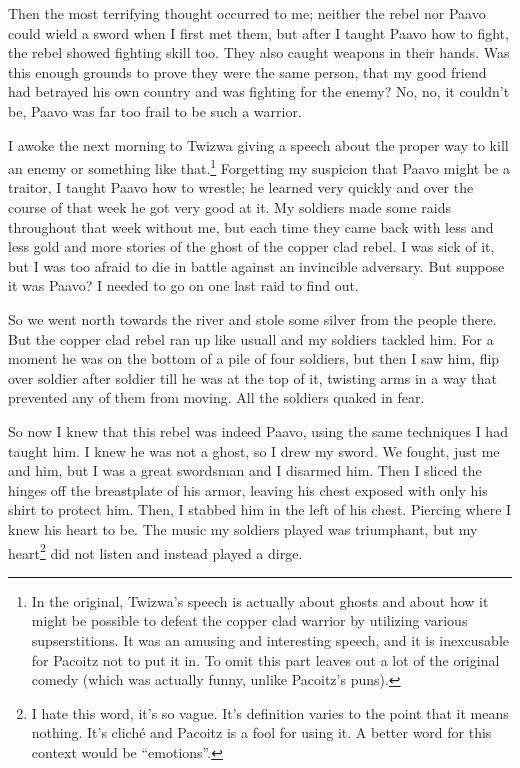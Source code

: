 Then the most terrifying thought occurred to me; neither the rebel nor Paavo could wield a sword when I first met them, but after I taught Paavo how to fight, the rebel showed fighting skill too. They also caught weapons in their hands. Was this enough grounds to prove they were the same person, that my good friend had betrayed his own country and was fighting for the enemy? No, no, it couldn't be, Paavo was far too frail to be such a warrior.

\tbreak

I awoke the next morning to Twizwa giving a speech about the proper way to kill an enemy or something like that.\footnote{In the original, Twizwa's speech is actually about ghosts and about how it might be possible to defeat the copper clad warrior by utilizing various supserstitions. It was an amusing and interesting speech, and it is inexcusable for Pacoitz not to put it in. To omit this part leaves out a lot of the original comedy (which was actually funny, unlike Pacoitz's puns).}
Forgetting my suspicion that Paavo might be a traitor, I taught Paavo how to wrestle; he learned very quickly and over the course of that week he got very good at it. My soldiers made some raids throughout that week without me, but each time they came back with less and less gold and more stories of the ghost of the copper clad rebel. I was sick of it, but I was too afraid to die in battle against an invincible adversary. But suppose it was Paavo? I needed to go on one last raid to find out.

So we went north towards the river and stole some silver from the people there. But the copper clad rebel ran up like usuall and my soldiers tackled him. For a moment he was on the bottom of a pile of four soldiers, but then I saw him, flip over soldier after soldier till he was at the top of it, twisting arms in a way that prevented any of them from moving. All the soldiers quaked in fear.

So now I knew that this rebel was indeed Paavo, using the same techniques I had taught him. I knew he was not a ghost, so I drew my sword. We fought, just me and him, but I was a great swordsman and I disarmed him. Then I sliced the hinges off the breastplate of his armor, leaving his chest exposed with only his shirt to protect him. Then, I stabbed him in the left of his chest. Piercing where I knew his heart to be. The music my soldiers played was triumphant, but my heart\footnote{I hate this word, it's so vague. It's definition varies to the point that it means nothing. It's clich\'{e} and Pacoitz is a fool for using it. A better word for this context would be ``emotions''.} did not listen and instead played a dirge. 

